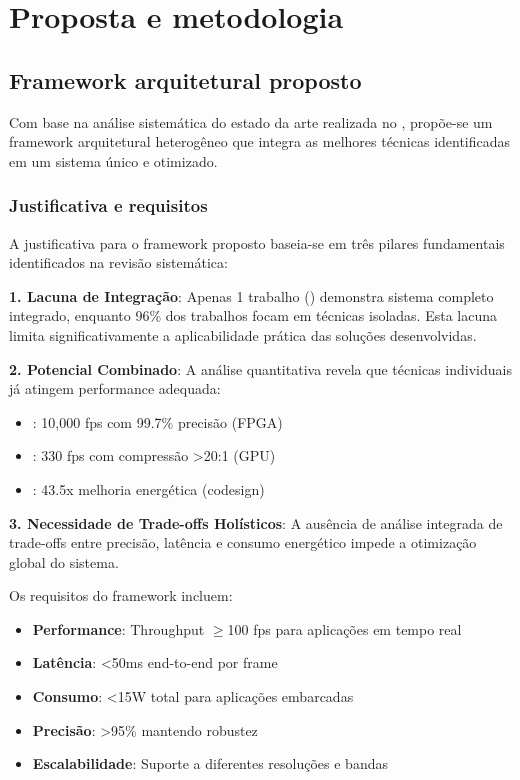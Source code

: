\chapter{Proposta e metodologia}\label{chp:desenvolvimento}

\section{Framework arquitetural proposto}\label{sec:framework_arquitetural}

Com base na análise sistemática do estado da arte realizada no , propõe-se um framework arquitetural heterogêneo que integra as melhores técnicas identificadas em um sistema único e otimizado.

\subsection{Justificativa e requisitos}\label{subsec:justificativa_requisitos}

A justificativa para o framework proposto baseia-se em três pilares fundamentais identificados na revisão sistemática:

\textbf{1. Lacuna de Integração}: Apenas 1 trabalho (\textcite{Shin2020}) demonstra sistema completo integrado, enquanto 96\% dos trabalhos focam em técnicas isoladas. Esta lacuna limita significativamente a aplicabilidade prática das soluções desenvolvidas.

\textbf{2. Potencial Combinado}: A análise quantitativa revela que técnicas individuais já atingem performance adequada:
\begin{itemize}
    \item \textcite{Martins2019}: 10,000 fps com 99.7\% precisão (FPGA)
    \item \textcite{Diaz2019}: 330 fps com compressão >20:1 (GPU)
    \item \textcite{Hwang2011}: 43.5x melhoria energética (codesign)
\end{itemize}

\textbf{3. Necessidade de Trade-offs Holísticos}: A ausência de análise integrada de trade-offs entre precisão, latência e consumo energético impede a otimização global do sistema.

Os requisitos do framework incluem:
\begin{itemize}
    \item \textbf{Performance}: Throughput $\geq$100 fps para aplicações em tempo real
    \item \textbf{Latência}: <50ms end-to-end por frame
    \item \textbf{Consumo}: <15W total para aplicações embarcadas
    \item \textbf{Precisão}: >95\% mantendo robustez
    \item \textbf{Escalabilidade}: Suporte a diferentes resoluções e bandas
\end{itemize}

